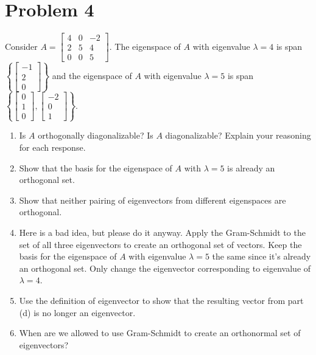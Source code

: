 \documentclass[letter,11pt]{article}
\theoremstyle{definition}
\begin{document}
\section{Problem 4}
Consider $A=\begin{bmatrix}4 & 0 & -2 \\ 2 & 5 & 4 \\ 0 & 0 & 5\end{bmatrix}$. The eigenspace of $A$ with eigenvalue $\lambda=4$ is span $\left\{\begin{bmatrix}-1 \\ 2 \\ 0\end{bmatrix}\right\}$ and the eigenspace of $A$ with eigenvalue $\lambda=5$ is span $\left\{\begin{bmatrix}0 \\ 1 \\ 0\end{bmatrix},\begin{bmatrix}-2 \\ 0 \\ 1\end{bmatrix}\right\}$.

\begin{enumerate}[label = \alph*.)]
    \item Is $A$ orthogonally diagonalizable? Is $A$ diagonalizable? Explain your reasoning for each response.
    
    \item Show that the basis for the eigenspace of $A$ with $\lambda=5$ is already an orthogonal set. 
    
    \item Show that neither pairing of eigenvectors from different eigenspaces are orthogonal. 
    
    \item Here is a bad idea, but please do it anyway. Apply the Gram-Schmidt to the set of all three eigenvectors to create an orthogonal set of vectors. Keep the basis for the eigenspace of $A$ with eigenvalue $\lambda=5$ the same since it's already an orthogonal set. Only change the eigenvector corresponding to eigenvalue of $\lambda=4$.
    
    \item Use the definition of eigenvector to show that the resulting vector from part (d) is no longer an eigenvector.
    
    \item When are we allowed to use Gram-Schmidt to create an orthonormal set of eigenvectors?
\end{enumerate}
\end{document}
